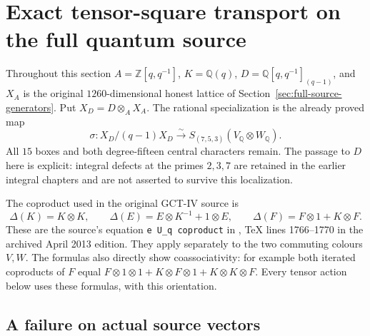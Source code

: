 \section{Exact tensor-square transport on the full quantum source}
\label{sec:quantum-tensor-symmetry}

Throughout this section $A=\mathbb Z[q,q^{-1}]$, $K=\mathbb Q(q)$,
$D=\mathbb Q[q,q^{-1}]_{(q-1)}$, and $X_A$ is the original
$1260$-dimensional honest lattice of
Section~\ref{sec:full-source-generators}. Put $X_D=D\otimes_A X_A$.
The rational specialization is the already proved map
\[
 \sigma:X_D/(q-1)X_D\xrightarrow{\sim}
 S_{(7,5,3)}(V_{\mathbb Q}\otimes W_{\mathbb Q}).
\]
All $15$ boxes and both degree-fifteen central characters remain.
The passage to $D$ here is explicit: integral defects at the primes
$2,3,7$ are retained in the earlier integral chapters and are not
asserted to survive this localization.

The coproduct used in the original GCT-IV source is
\begin{equation}\label{eq:qt-source-coproduct}
 \Delta(K)=K\otimes K,\qquad
 \Delta(E)=E\otimes K^{-1}+1\otimes E,\qquad
 \Delta(F)=F\otimes1+K\otimes F.
\end{equation}
These are the source's equation \texttt{e U\_q coproduct}
in \cite{blasiakmulmuleysohoni2013gct4},
TeX lines 1766--1770 in the archived April 2013 edition.
They apply separately to the two commuting colours $V,W$.
The formulas also directly show coassociativity: for example both
iterated coproducts of $F$ equal
$F\otimes1\otimes1+K\otimes F\otimes1+K\otimes K\otimes F$.
Every tensor action below uses these formulas, with this orientation.

\subsection{A failure on actual source vectors}

